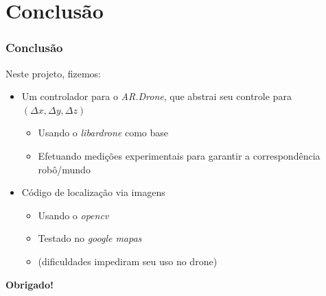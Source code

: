 \documentclass[]{beamer}
\begin{document}
\section{Conclusão}
\begin{frame}
\frametitle{Conclusão}

Neste projeto, fizemos:
\begin{itemize}
\pause
\item Um controlador para o \emph{AR.Drone}, que abstrai seu controle para $(\Delta x, \Delta y, \Delta z)$
	\begin{itemize}
	\pause
	\item Usando o \emph{libardrone} como base
	\pause
	\item Efetuando medições experimentais para garantir a correspondência robô/mundo
	\end{itemize} 
\pause
\item Código de localização via imagens
	\begin{itemize}
	\pause
	\item Usando o \emph{opencv}
	\pause
	\item Testado no \emph{google mapas}
	\pause
	\item (dificuldades impediram seu uso no drone)
	\end{itemize}
\end{itemize}

\end{frame}

\begin{frame}
\begin{center}
\textbf{Obrigado!}
\end{center}
\end{frame}
\end{document}
